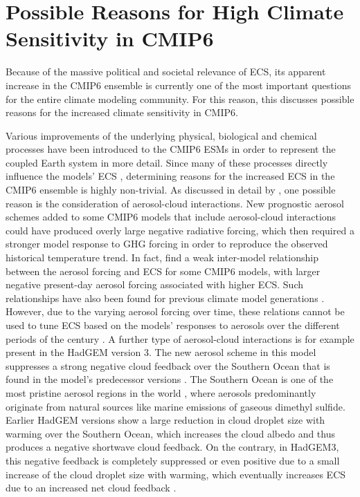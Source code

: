 \section{Possible Reasons for High Climate Sensitivity in \acs{CMIP}6}
\label{sec:04:possible_reasons_high_ecs_cmip6}

Because of the massive political and societal relevance of \ac{ECS}, its
apparent increase in the \acs{CMIP}6 ensemble is currently one of the most
important questions for the entire climate modeling community. For this reason,
this  discusses possible
reasons for the increased climate sensitivity in \acs{CMIP}6.

Various improvements of the underlying physical, biological and chemical
processes have been introduced to the \acs{CMIP}6 \acp{ESM} in order to
represent the coupled Earth system in more detail. Since many of these
processes directly influence the models' \ac{ECS} \autocite{Forster2020},
determining reasons for the increased \ac{ECS} in the \acs{CMIP}6 ensemble is
highly non-trivial. As discussed in detail by \textcite{Meehl2020}, one
possible reason is the consideration of aerosol-cloud interactions. New
prognostic aerosol schemes added to some \acs{CMIP}6 models that include
aerosol-cloud interactions could have produced overly large negative radiative
forcing, which then required a stronger model response to \ac{GHG} forcing in
order to reproduce the observed historical temperature trend. In fact,
\textcite{Meehl2020} find a weak inter-model relationship between the aerosol
forcing and \ac{ECS} for some \acs{CMIP}6 models, with larger negative
present-day aerosol forcing associated with higher \ac{ECS}. Such relationships
have also been found for previous climate model generations
\autocite{Kiehl2007, Forster2013}. However, due to the varying aerosol forcing
over time, these relations cannot be used to tune \ac{ECS} based on the models'
responses to aerosols over the different periods of the  century
\autocite{Dittus2020}. A further type of aerosol-cloud interactions is for
example present in the \ac{HadGEM} version 3. The new aerosol scheme in this
model suppresses a strong negative cloud feedback over the Southern Ocean that
is found in the model's predecessor versions \autocite{BodasSalcedo2019}. The
Southern Ocean is one of the most pristine aerosol regions in the world
\autocite{Hamilton2014}, where aerosols predominantly originate from natural
sources like marine emissions of gaseous dimethyl sulfide. Earlier \ac{HadGEM}
versions show a large reduction in cloud droplet size with warming over the
Southern Ocean, which increases the cloud albedo and thus produces a negative
shortwave cloud feedback. On the contrary, in \acs{HadGEM}3, this negative
feedback is completely suppressed or even positive due to a small increase of
the cloud droplet size with warming, which eventually increases \ac{ECS} due to
an increased net cloud feedback \autocite{BodasSalcedo2019}.

